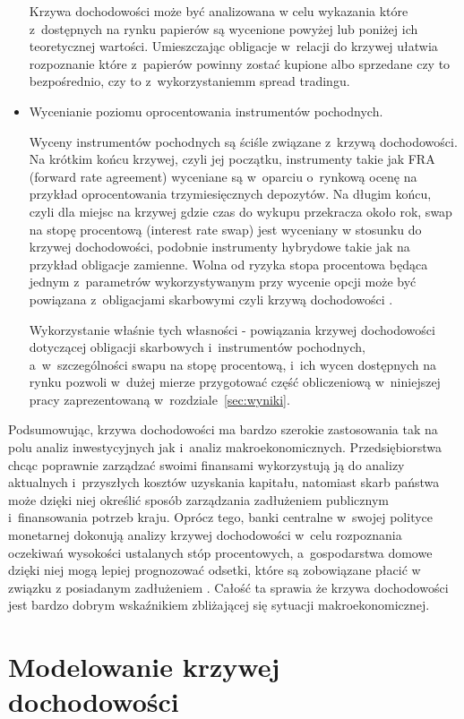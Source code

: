 \documentclass[12pt,a4paper,twoside,openany]{book}
\begin{document}
\begin{itemize}
Krzywa dochodowości może być analizowana w celu wykazania które z~dostępnych na rynku papierów są wycenione powyżej lub poniżej ich teoretycznej wartości. Umieszczając obligacje w~relacji do krzywej ułatwia rozpoznanie które z~papierów powinny zostać kupione albo sprzedane czy to bezpośrednio, czy to z~wykorzystaniemm spread tradingu.

\item Wycenianie poziomu oprocentowania instrumentów pochodnych.

Wyceny instrumentów pochodnych są ściśle związane z~krzywą dochodowości. Na krótkim końcu krzywej, czyli jej początku, instrumenty takie jak FRA (forward rate agreement) wyceniane są w~oparciu o~rynkową ocenę na przykład oprocentowania trzymiesięcznych depozytów. Na długim końcu, czyli dla miejsc na krzywej gdzie czas do wykupu przekracza około rok, swap na stopę procentową (interest rate swap) jest wyceniany w stosunku do krzywej dochodowości, podobnie instrumenty hybrydowe takie jak na przykład obligacje zamienne. Wolna od ryzyka stopa procentowa będąca jednym z~parametrów wykorzystywanym przy wycenie opcji może być powiązana z~obligacjami skarbowymi czyli krzywą dochodowości \citep{choudhry2004}. 

Wykorzystanie właśnie tych własności - powiązania krzywej dochodowości dotyczącej obligacji skarbowych i~instrumentów pochodnych, a~w~szczególności swapu na stopę procentową, i~ich wycen dostępnych na rynku pozwoli w~dużej mierze przygotować część obliczeniową w~niniejszej pracy zaprezentowaną w~rozdziale~\ref{sec:wyniki}.
\end{itemize}

Podsumowując, krzywa dochodowości ma bardzo szerokie zastosowania tak na polu analiz inwestycyjnych jak i~analiz makroekonomicznych. Przedsiębiorstwa chcąc poprawnie zarządzać swoimi finansami wykorzystują ją do analizy aktualnych i~przyszłych kosztów uzyskania kapitału, natomiast skarb państwa może dzięki niej określić sposób zarządzania zadłużeniem publicznym i~finansowania potrzeb kraju. Oprócz tego, banki centralne w~swojej polityce monetarnej dokonują analizy krzywej dochodowości w~celu rozpoznania oczekiwań wysokości ustalanych stóp procentowych, a~gospodarstwa domowe dzięki niej mogą lepiej prognozować odsetki, które są zobowiązane płacić w związku z posiadanym zadłużeniem \citep{rubaszek2012}. Całość ta sprawia że krzywa dochodowości jest bardzo dobrym wskaźnikiem zbliżającej się sytuacji makroekonomicznej. 

\section{Modelowanie krzywej dochodowości}
\label{sec:modelowanie}
\end{document}

